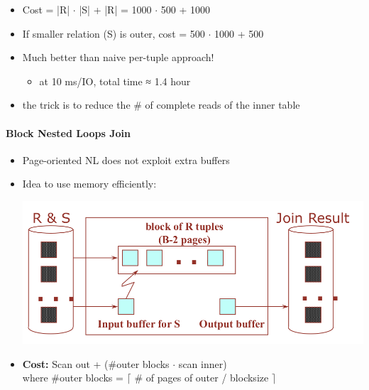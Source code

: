 \begin{itemize}
\item Cost = |R| $\cdot$ |S| + |R| = 1000 $\cdot$ 500 + 1000
\item If smaller relation (S) is outer,
  cost = 500 $\cdot$ 1000 + 500
\item Much better than naive per-tuple approach!
  \begin{itemize}
  \item at 10 ms/IO, total time ≈ 1.4 hour
  \end{itemize}
\item the trick is to reduce the \# of complete reads of the inner table
\end{itemize}

\paragraph{Block Nested Loops Join}
\begin{itemize}
\item Page-oriented NL does not exploit extra buffers
\item Idea to use memory efficiently:

  \includegraphics[scale=0.15]{graphics/block-nested-loop-join.png}

\item \textbf{Cost:} Scan out + (\#outer blocks $\cdot$ scan inner) \\
  where \#outer blocks =
  $\lceil$ \# of pages of outer / blocksize $\rceil$
\end{itemize}

